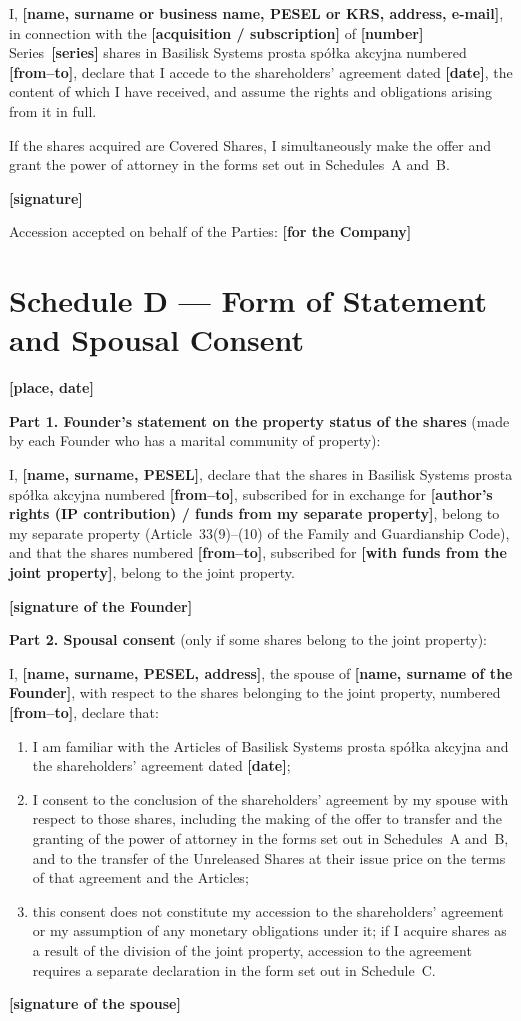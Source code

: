 \documentclass[12pt,a4paper]{report}
\newcommand{\field}[1]{\textbf{[#1]}}
\newcommand{\CompanyFull}{Basilisk Systems prosta spółka akcyjna}
\begin{document}
I, \field{name, surname or business name, PESEL or KRS, address, e-mail}, in connection with the \field{acquisition / subscription} of \field{number} Series~\field{series} shares in \CompanyFull{} numbered \field{from--to}, declare that I accede to the shareholders' agreement dated \field{date}, the content of which I have received, and assume the rights and obligations arising from it in full.

If the shares acquired are Covered Shares, I simultaneously make the offer and grant the power of attorney in the forms set out in Schedules~A and~B.

\field{signature}

Accession accepted on behalf of the Parties: \field{for the Company}

\newpage
\section*{Schedule D --- Form of Statement and Spousal Consent}

\field{place, date}

\textbf{Part 1. Founder's statement on the property status of the shares} (made by each Founder who has a marital community of property):

I, \field{name, surname, PESEL}, declare that the shares in \CompanyFull{} numbered \field{from--to}, subscribed for in exchange for \field{author's rights (IP contribution) / funds from my separate property}, belong to my separate property (Article~33(9)--(10) of the Family and Guardianship Code), and that the shares numbered \field{from--to}, subscribed for \field{with funds from the joint property}, belong to the joint property.

\field{signature of the Founder}

\textbf{Part 2. Spousal consent} (only if some shares belong to the joint property):

I, \field{name, surname, PESEL, address}, the spouse of \field{name, surname of the Founder}, with respect to the shares belonging to the joint property, numbered \field{from--to}, declare that:

\begin{enumerate}
  \item I am familiar with the Articles of \CompanyFull{} and the shareholders' agreement dated \field{date};
  \item I consent to the conclusion of the shareholders' agreement by my spouse with respect to those shares, including the making of the offer to transfer and the granting of the power of attorney in the forms set out in Schedules~A and~B, and to the transfer of the Unreleased Shares at their issue price on the terms of that agreement and the Articles;
  \item this consent does not constitute my accession to the shareholders' agreement or my assumption of any monetary obligations under it; if I acquire shares as a result of the division of the joint property, accession to the agreement requires a separate declaration in the form set out in Schedule~C.
\end{enumerate}

\field{signature of the spouse}
\end{document}
